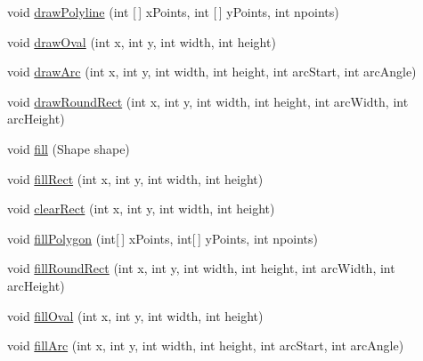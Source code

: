 \begin{DoxyCompactItemize}
\item 
void \mbox{\hyperlink{classorg_1_1jfree_1_1experimental_1_1swt_1_1_s_w_t_graphics2_d_a62b3e5a50d43e314bf8eb55187ba4cf7}{draw\+Polyline}} (int \mbox{[}$\,$\mbox{]} x\+Points, int \mbox{[}$\,$\mbox{]} y\+Points, int npoints)
\item 
void \mbox{\hyperlink{classorg_1_1jfree_1_1experimental_1_1swt_1_1_s_w_t_graphics2_d_a2b277fbe9f9c58212391fb98f8e34d5f}{draw\+Oval}} (int x, int y, int width, int height)
\item 
void \mbox{\hyperlink{classorg_1_1jfree_1_1experimental_1_1swt_1_1_s_w_t_graphics2_d_ab2d3057a56a280030f5170021933aad1}{draw\+Arc}} (int x, int y, int width, int height, int arc\+Start, int arc\+Angle)
\item 
void \mbox{\hyperlink{classorg_1_1jfree_1_1experimental_1_1swt_1_1_s_w_t_graphics2_d_a3d2fbddf57a59554f34d16f2c9237794}{draw\+Round\+Rect}} (int x, int y, int width, int height, int arc\+Width, int arc\+Height)
\item 
void \mbox{\hyperlink{classorg_1_1jfree_1_1experimental_1_1swt_1_1_s_w_t_graphics2_d_a99e7ceabaaaf4f1ec0c9545a8765ee10}{fill}} (Shape shape)
\item 
void \mbox{\hyperlink{classorg_1_1jfree_1_1experimental_1_1swt_1_1_s_w_t_graphics2_d_a9e471a210aec48a4f2f9a7e2f51e0ed6}{fill\+Rect}} (int x, int y, int width, int height)
\item 
void \mbox{\hyperlink{classorg_1_1jfree_1_1experimental_1_1swt_1_1_s_w_t_graphics2_d_a68cee69da3b3e75bb89dbd08f6ec2abf}{clear\+Rect}} (int x, int y, int width, int height)
\item 
void \mbox{\hyperlink{classorg_1_1jfree_1_1experimental_1_1swt_1_1_s_w_t_graphics2_d_a8975208f183e6806cc8a04f87166690c}{fill\+Polygon}} (int\mbox{[}$\,$\mbox{]} x\+Points, int\mbox{[}$\,$\mbox{]} y\+Points, int npoints)
\item 
void \mbox{\hyperlink{classorg_1_1jfree_1_1experimental_1_1swt_1_1_s_w_t_graphics2_d_a7262e304a98d833a913e4ae3366c9be2}{fill\+Round\+Rect}} (int x, int y, int width, int height, int arc\+Width, int arc\+Height)
\item 
void \mbox{\hyperlink{classorg_1_1jfree_1_1experimental_1_1swt_1_1_s_w_t_graphics2_d_a9861eee8b373cb8b6bad99d83b4f41ce}{fill\+Oval}} (int x, int y, int width, int height)
\item 
void \mbox{\hyperlink{classorg_1_1jfree_1_1experimental_1_1swt_1_1_s_w_t_graphics2_d_a7c36e5f4afcf2bdfcce4da8c6b311921}{fill\+Arc}} (int x, int y, int width, int height, int arc\+Start, int arc\+Angle)

\end{DoxyCompactItemize}
